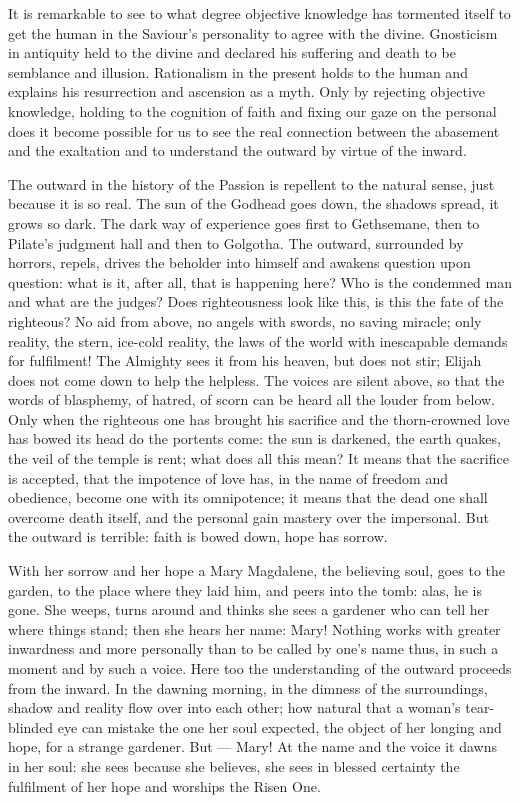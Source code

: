 \documentclass[12pt,a4paper,openany]{book}
\newcommand{\opage}[1]{\marginnote{\footnotesize\textit{[#1]}}}
\begin{document}
It is remarkable to see to what degree objective knowledge has tormented itself to get the human in the
Saviour's personality to agree with the divine. Gnosticism in antiquity held to the divine and declared
his suffering and death to be semblance and illusion. Rationalism in the present holds to the human and
explains his resurrection and ascension as a myth. Only by rejecting objective knowledge, holding to the
cognition of faith and fixing our gaze on the personal does it become possible for us to see the real
connection between the abasement and the exaltation and to understand the outward by virtue of the
inward.

The outward in the history of the Passion is repellent to the natural sense, just because it is so real.
The sun of the Godhead goes down, the shadows spread, it grows so dark. The dark way of experience goes
first to Gethsemane, then to Pilate's judgment hall and then to Golgotha. The outward, surrounded by
horrors, repels, drives the beholder into himself and awakens question upon question: what is it, after
all, that is happening here? Who is the condemned man and what are the judges? Does righteousness look
like this, is this the fate of the righteous? No aid from above, no angels with swords, no saving
miracle; only reality, the stern, ice-cold reality, the laws of the world with inescapable demands for
fulfilment! The Almighty sees it from his heaven,
\setcounter{footnote}{0}%
\opage{83}but does not stir; Elijah does not come down to help the helpless. The voices are silent above,
so that the words of blasphemy, of hatred, of scorn can be heard all the louder from below. Only when the
righteous one has brought his sacrifice and the thorn-crowned love has bowed its head do the portents
come: the sun is darkened, the earth quakes, the veil of the temple is rent; what does all this mean? It
means that the sacrifice is accepted, that the impotence of love has, in the name of freedom and
obedience, become one with its omnipotence; it means that the dead one shall overcome death itself, and
the personal gain mastery over the impersonal. But the outward is terrible: faith is bowed down, hope
has sorrow.

With her sorrow and her hope a Mary Magdalene, the believing soul, goes to the garden, to the place where
they laid him, and peers into the tomb: alas, he is gone. She weeps, turns around and thinks she sees a
gardener who can tell her where things stand; then she hears her name: Mary! Nothing works with greater
inwardness and more personally than to be called by one's name thus, in such a moment and by such a
voice. Here too the understanding of the outward proceeds from the inward. In the dawning morning, in the
dimness of the surroundings, shadow and reality flow over into each other; how natural that a woman's
tear-blinded eye can mistake the one her soul expected, the object of her longing and hope, for a
strange gardener. But --- Mary! At the name and the voice it dawns in her soul: she sees because she
believes, she sees in blessed certainty the fulfilment of her hope and worships the Risen One.
\end{document}
